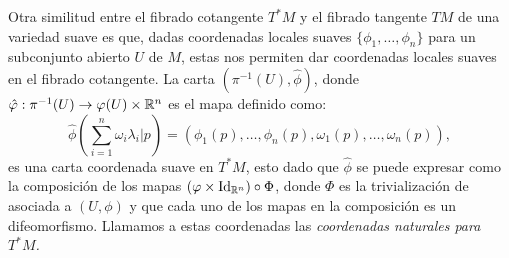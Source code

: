 Otra similitud entre el fibrado cotangente $T^{*}M$ y el fibrado tangente $TM$ de una variedad suave es que, dadas coordenadas locales suaves $\{\phi_1,\ldots,\phi_n\}$ para un subconjunto abierto $U$ de $M$, estas nos permiten dar coordenadas locales suaves en el fibrado cotangente. La carta $(\pi^{-1}(U), \hat{\phi})$, donde $\hat{\varphi}: \pi^{-1}(U) \to \varphi(U) \times \mathbb{R}^n$ es el mapa definido como:
\[
  \hat{\phi} \left(\sum_{i=1}^{n} \omega_i \lambda_i |p \right) 
  = \left(\phi_1(p), \ldots, \phi_n(p), \omega_1(p), \ldots, \omega_n(p) \right),
\]
es una carta coordenada suave en $T^{*}M$, esto dado que $\hat{\phi}$ se puede expresar como la composición de los mapas $(\varphi \times \mathrm{Id}_{\mathbb{R}^n}) \circ \Phi$, donde $\Phi$ es la trivialización de asociada a $(U,\phi)$ y que cada uno de los mapas en la composición es un difeomorfismo. Llamamos a estas coordenadas las \it{coordenadas naturales para $T^{*}M$}.
